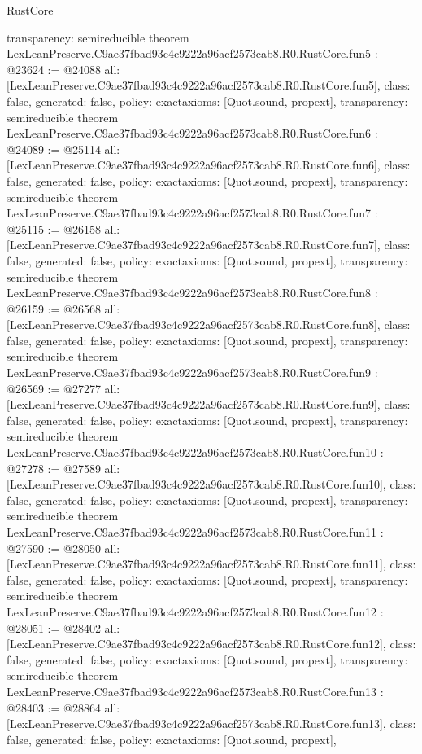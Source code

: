 \begin{lexlean}{RustCore}
\begin{coremodule}
{  transparency: semireducible
}
theorem LexLeanPreserve.C9ae37fbad93c4c9222a96acf2573cab8.R0.RustCore.fun5 : @23624 := @24088 {
  all: [LexLeanPreserve.C9ae37fbad93c4c9222a96acf2573cab8.R0.RustCore.fun5],
  class: false,
  generated: false,
  policy: exact{axioms: [Quot.sound, propext]},
  transparency: semireducible
}
theorem LexLeanPreserve.C9ae37fbad93c4c9222a96acf2573cab8.R0.RustCore.fun6 : @24089 := @25114 {
  all: [LexLeanPreserve.C9ae37fbad93c4c9222a96acf2573cab8.R0.RustCore.fun6],
  class: false,
  generated: false,
  policy: exact{axioms: [Quot.sound, propext]},
  transparency: semireducible
}
theorem LexLeanPreserve.C9ae37fbad93c4c9222a96acf2573cab8.R0.RustCore.fun7 : @25115 := @26158 {
  all: [LexLeanPreserve.C9ae37fbad93c4c9222a96acf2573cab8.R0.RustCore.fun7],
  class: false,
  generated: false,
  policy: exact{axioms: [Quot.sound, propext]},
  transparency: semireducible
}
theorem LexLeanPreserve.C9ae37fbad93c4c9222a96acf2573cab8.R0.RustCore.fun8 : @26159 := @26568 {
  all: [LexLeanPreserve.C9ae37fbad93c4c9222a96acf2573cab8.R0.RustCore.fun8],
  class: false,
  generated: false,
  policy: exact{axioms: [Quot.sound, propext]},
  transparency: semireducible
}
theorem LexLeanPreserve.C9ae37fbad93c4c9222a96acf2573cab8.R0.RustCore.fun9 : @26569 := @27277 {
  all: [LexLeanPreserve.C9ae37fbad93c4c9222a96acf2573cab8.R0.RustCore.fun9],
  class: false,
  generated: false,
  policy: exact{axioms: [Quot.sound, propext]},
  transparency: semireducible
}
theorem LexLeanPreserve.C9ae37fbad93c4c9222a96acf2573cab8.R0.RustCore.fun10 : @27278 := @27589 {
  all: [LexLeanPreserve.C9ae37fbad93c4c9222a96acf2573cab8.R0.RustCore.fun10],
  class: false,
  generated: false,
  policy: exact{axioms: [Quot.sound, propext]},
  transparency: semireducible
}
theorem LexLeanPreserve.C9ae37fbad93c4c9222a96acf2573cab8.R0.RustCore.fun11 : @27590 := @28050 {
  all: [LexLeanPreserve.C9ae37fbad93c4c9222a96acf2573cab8.R0.RustCore.fun11],
  class: false,
  generated: false,
  policy: exact{axioms: [Quot.sound, propext]},
  transparency: semireducible
}
theorem LexLeanPreserve.C9ae37fbad93c4c9222a96acf2573cab8.R0.RustCore.fun12 : @28051 := @28402 {
  all: [LexLeanPreserve.C9ae37fbad93c4c9222a96acf2573cab8.R0.RustCore.fun12],
  class: false,
  generated: false,
  policy: exact{axioms: [Quot.sound, propext]},
  transparency: semireducible
}
theorem LexLeanPreserve.C9ae37fbad93c4c9222a96acf2573cab8.R0.RustCore.fun13 : @28403 := @28864 {
  all: [LexLeanPreserve.C9ae37fbad93c4c9222a96acf2573cab8.R0.RustCore.fun13],
  class: false,
  generated: false,
  policy: exact{axioms: [Quot.sound, propext]},
}
\end{coremodule}
\end{lexlean}
